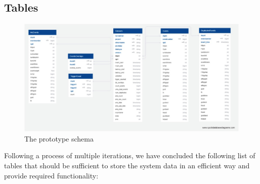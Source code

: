 \documentclass{webofc}
\begin{document}
\begin{linenumbers}
\subsection{Tables}
\label{sec-5-tables}
\begin{figure}
\centering
\includegraphics[width=\linewidth,clip]{schema.jpg}
\caption{The prototype schema}
\label{fig:schema}
\end{figure}
Following a process of multiple iterations, we have concluded the following list of tables that should be sufficient to store the system data in an efficient way and provide required functionality: \newline


\end{linenumbers}
\end{document}
